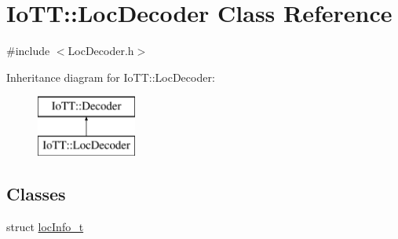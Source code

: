 \hypertarget{classIoTT_1_1LocDecoder}{}\section{Io\+TT\+:\+:Loc\+Decoder Class Reference}
\label{classIoTT_1_1LocDecoder}


{\ttfamily \#include $<$Loc\+Decoder.\+h$>$}

Inheritance diagram for Io\+TT\+:\+:Loc\+Decoder\+:\begin{figure}[H]
\begin{center}
\leavevmode
\includegraphics[height=2.000000cm]{classIoTT_1_1LocDecoder}
\end{center}
\end{figure}
\subsection*{Classes}
\begin{DoxyCompactItemize}
\item 
struct \hyperlink{structIoTT_1_1LocDecoder_1_1locInfo__t}{loc\+Info\+\_\+t}
\end{DoxyCompactItemize}
